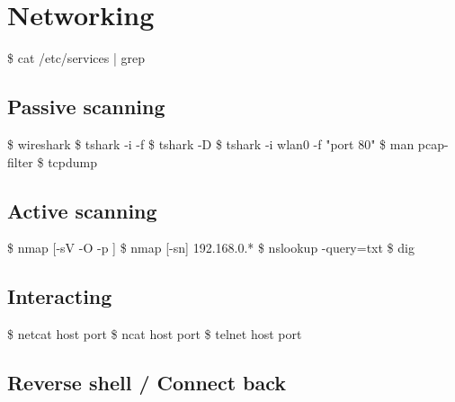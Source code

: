 \documentclass{refcard}
\begin{document}
\pagebreak

\section{Networking}

\begin{ldesc}
	 \$ cat /etc/services | grep 
\end{ldesc}

\subsection{Passive scanning}

\begin{ldesc}
	  \$ wireshark
	              \$ tshark -i  -f 
	              \$ tshark -D
	            \$ tshark -i wlan0 -f "port 80"
	                \$ man pcap-filter
	      \$ tcpdump
\end{ldesc}

\subsection{Active scanning}

\begin{ldesc}
	           \$ nmap [-sV -O -p ] 
	      \$ nmap [-sn] 192.168.0.*
	      \$ nslookup -query=txt 
	  \$ dig \I{[@srv]} 
\end{ldesc}

\subsection{Interacting}

\begin{ldesc}
	        \$ netcat host port
	     \$ ncat host port
	 \$ telnet host port
\end{ldesc}


\subsection{Reverse shell / Connect back}
\end{document}
